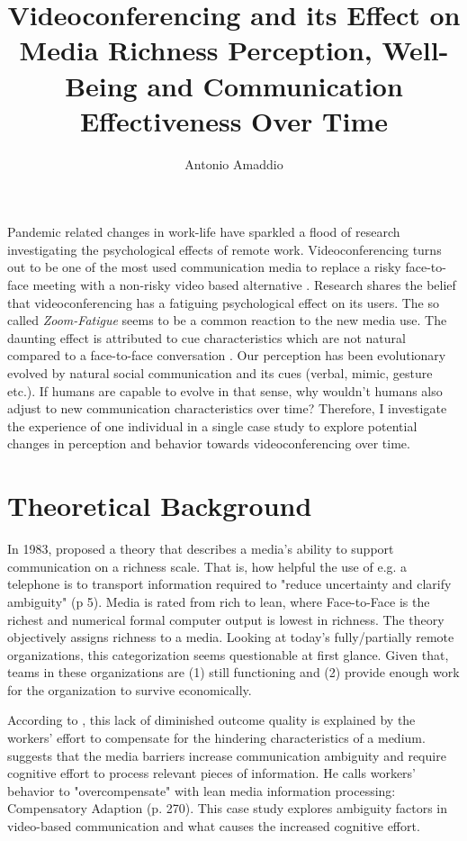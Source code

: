 \documentclass[man]{apa7}
\title{Videoconferencing and its Effect on Media Richness Perception, Well-Being and Communication Effectiveness Over Time}
\author{Antonio Amaddio}
\affiliation{Freie Universität Berlin \\ A\&O Vertiefung, Winter 2022/23, Supervisor: Dr. Lisa Handke}
\begin{document}
\maketitle
Pandemic related changes in work-life have sparkled a flood of research investigating the psychological effects of remote work. Videoconferencing turns out to be one of the most used communication media to replace a risky face-to-face meeting with a non-risky video based alternative \parencite{Riedl2021}.  Research shares the belief that videoconferencing has a fatiguing psychological effect on its users. The so called \textit{Zoom-Fatigue} seems to be a common reaction to the new media use. The daunting effect is attributed to cue characteristics which are not natural compared to a face-to-face conversation \parencite{Riedl2021}. Our perception has been evolutionary evolved by natural social communication and its cues (verbal, mimic, gesture etc.). If humans are capable to evolve in that sense, why wouldn't humans also adjust to new communication characteristics over time? Therefore, I investigate the experience of one individual in a single case study to explore potential changes in perception and behavior towards videoconferencing over time.

\section{Theoretical Background}

In 1983, \citeauthor{daft1983information} proposed a theory that describes a media's ability to support communication on a richness scale. That is, how helpful the use of e.g. a telephone is to transport information required to "reduce uncertainty and clarify ambiguity" (p 5). Media is rated from rich to lean, where Face-to-Face is the richest and numerical formal computer output is lowest in richness. The theory objectively assigns richness to a media. Looking at today's fully/partially remote organizations, this categorization seems questionable at first glance. Given that, teams in these organizations are (1) still functioning and (2) provide enough work for the organization to survive economically.

According to \citeauthor{Kock2005}, this lack of diminished outcome quality is explained by the workers' effort to compensate for the hindering characteristics of a medium. \citeauthor{Kock2005} suggests that the media barriers increase communication ambiguity and require cognitive effort to process relevant pieces of information. He calls workers' behavior to "overcompensate" with lean media information processing: Compensatory Adaption (p. 270). This case study explores ambiguity factors in video-based communication and what causes the increased cognitive effort.
\end{document}
